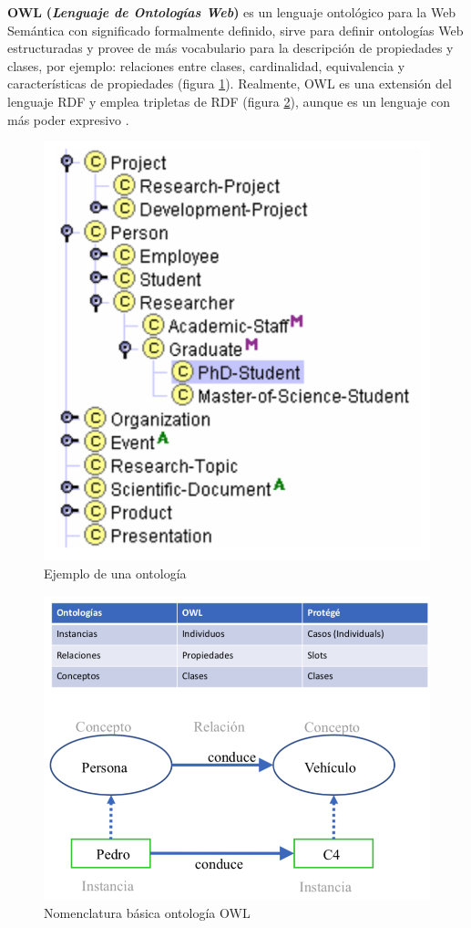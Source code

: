 \textbf{OWL} \textbf{(\textit{Lenguaje de Ontologías Web})} es un lenguaje ontológico para la Web Semántica con significado formalmente definido, sirve para definir ontologías Web estructuradas y provee de más vocabulario para la descripción de propiedades y clases, por ejemplo: relaciones entre clases, cardinalidad, equivalencia y características de propiedades (figura \ref{fig:ejemplo-owl}). Realmente, OWL es una extensión del lenguaje RDF y emplea tripletas de RDF (figura \ref{fig:nomenclatura}), aunque es un lenguaje con más poder expresivo \cite{aplicacion}.

\begin{figure}[H]
	\centering
	\includegraphics[width=0.51\linewidth]{imagenes/capitulo3/ejemplo-owl}
	\caption{Ejemplo de una ontología \cite{apuntes-clase-jose}}
	\label{fig:ejemplo-owl}
\end{figure}

\begin{figure}[H]
	\centering
	\includegraphics[width=0.63\linewidth]{imagenes/capitulo3/nomenclatura}
	\caption{Nomenclatura básica ontología OWL \cite{apuntes-clase-jose}}
	\label{fig:nomenclatura}
\end{figure}


